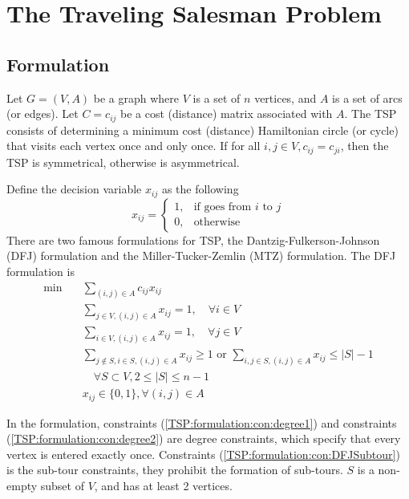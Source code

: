 		\chapter{The Traveling Salesman Problem}
			\section{Formulation}
				Let $G = (V, A)$ be a graph where $V$ is a set of $n$ vertices, and $A$ is a set of arcs (or edges). Let $C = c_{ij}$ be a cost (distance) matrix associated with $A$. The TSP consists of determining a minimum cost (distance) Hamiltonian circle (or cycle) that visits each vertex once and only once. If for all $i, j \in V, c_{ij} = c_{ji}$, then the TSP is symmetrical, otherwise is asymmetrical.

				Define the decision variable $x_{ij}$ as the following
				\begin{equation}
					x_{ij} = \begin{cases}1, &\text{if goes from } i \text{ to } j\\ 0, & \text{otherwise}\end{cases}
				\end{equation}
				There are two famous formulations for TSP, the Dantzig-Fulkerson-Johnson (DFJ) formulation and the Miller-Tucker-Zemlin (MTZ) formulation. The DFJ formulation is
				\begin{align}
					\min \quad &\sum_{(i, j)\in A} c_{ij}x_{ij} \\
					& \sum_{j \in V, (i,j)\in A} x_{ij} = 1, \quad \forall i \in V \label{TSP:formulation:con:degree1}\\
					& \sum_{i \in V, (i,j)\in A} x_{ij} = 1, \quad \forall j \in V \label{TSP:formulation:con:degree2}\\
					& \sum_{j\notin S, i\in S, (i,j)\in A} x_{ij} \ge 1 \text{ or } \sum_{i, j \in S, (i, j) \in A} x_{ij} \le |S| - 1 \nonumber \\
					& \quad \forall S \subset V, 2\le |S| \le n-1 \label{TSP:formulation:con:DFJSubtour}\\
					& x_{ij} \in \{0, 1\}, \forall (i, j) \in A 
				\end{align}

				In the formulation, constraints (\ref{TSP:formulation:con:degree1}) and constraints (\ref{TSP:formulation:con:degree2}) are degree constraints, which specify that every vertex is entered exactly once. Constraints (\ref{TSP:formulation:con:DFJSubtour}) is the sub-tour constraints, they prohibit the formation of sub-tours. $S$ is a non-empty subset of $V$, and has at least 2 vertices. 

